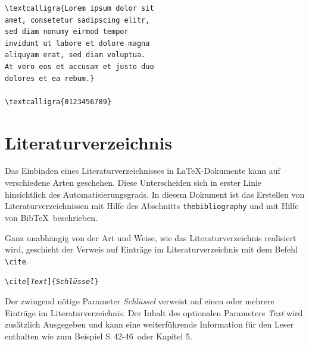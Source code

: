 \documentclass[a4paper,10pt,twoside]{scrbook}
\begin{document}
{%
\begin{minipage}[h]{0.54\textwidth}
\setlength{\parskip}{1em}
\frenchspacing
\begin{Verbatim}[frame=single]
\textcalligra{Lorem ipsum dolor sit 
amet, consetetur sadipscing elitr, 
sed diam nonumy eirmod tempor 
invidunt ut labore et dolore magna 
aliquyam erat, sed diam voluptua. 
At vero eos et accusam et justo duo 
dolores et ea rebum.}

\textcalligra{0123456789}
\end{Verbatim}
\end{minipage}
\hfill
\begin{minipage}[h]{0.38\textwidth}
\setlength{\parskip}{1em}
\frenchspacing
{}

\end{minipage}


\chapter{Literaturverzeichnis}
\label{Kapitel_Literaturverzeichnis}

Das Einbinden eines Literaturverzeichnisses in \LaTeX-Dokumente kann auf verschiedene Arten geschehen. Diese Unterscheiden sich in erster Linie hinsichtlich des Automatisierungsgrads. In diesem Dokument ist das Erstellen von Literaturverzeichnissen mit Hilfe des Abschnitts \verb!thebibliography! und mit Hilfe von Bib\TeX\ beschrieben.

Ganz unabhängig von der Art und Weise, wie das Literaturverzeichnis realisiert wird, geschieht der Verweis auf Einträge im Literaturverzeichnis mit dem Befehl \verb|\cite|.

\begin{boxedminipage}{\textwidth}
	\texttt{\textbackslash cite[\textsl{Text}]\{\textsl{Schlüssel}\}} 
\end{boxedminipage}

Der zwingend nötige Parameter \textsl{Schlüssel} verweist auf einen oder mehrere Einträge im Literaturverzeichnis. Der Inhalt des optionalen Parameters  \textsl{Text} wird zusätzlich Ausgegeben und kann eine weiterführende Information für den Leser enthalten wie zum Beispiel \glqq S.\,42-46\grqq\ oder \glqq Kapitel 5\grqq.

}
\end{document}
